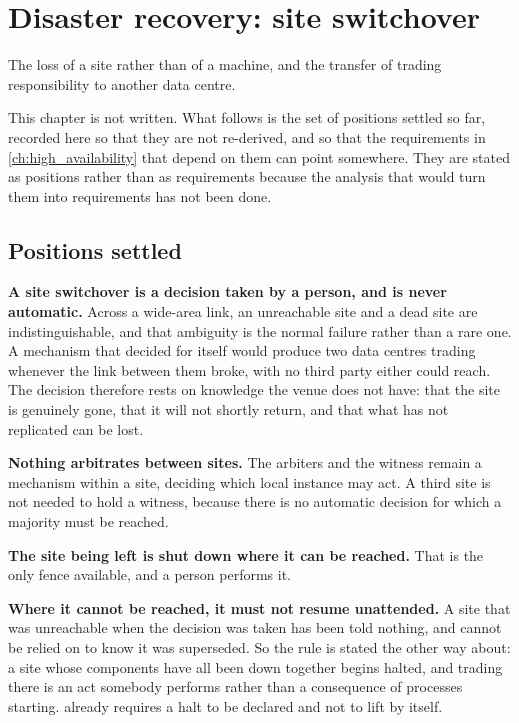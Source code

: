 \chapter{Disaster recovery: site switchover}
\label{ch:disaster_recovery}

The loss of a site rather than of a machine, and the transfer of trading
responsibility to another data centre.

This chapter is not written. What follows is the set of positions settled so far,
recorded here so that they are not re-derived, and so that the requirements in
\cref{ch:high_availability} that depend on them can point somewhere. They are
stated as positions rather than as requirements because the analysis that would
turn them into requirements has not been done.

\section{Positions settled}
\label{sec:dr:settled}

\textbf{A site switchover is a decision taken by a person, and is never
automatic.} Across a wide-area link, an unreachable site and a dead site are
indistinguishable, and that ambiguity is the normal failure rather than a rare
one. A mechanism that decided for itself would produce two data centres trading
whenever the link between them broke, with no third party either could reach. The
decision therefore rests on knowledge the venue does not have: that the site is
genuinely gone, that it will not shortly return, and that what has not replicated
can be lost.

\textbf{Nothing arbitrates between sites.} The arbiters and the witness remain a
mechanism within a site, deciding which local instance may act. A third site is
not needed to hold a witness, because there is no automatic decision for which a
majority must be reached.

\textbf{The site being left is shut down where it can be reached.} That is the
only fence available, and a person performs it.

\textbf{Where it cannot be reached, it must not resume unattended.} A site that
was unreachable when the decision was taken has been told nothing, and cannot be
relied on to know it was superseded. So the rule is stated the other way about: a
site whose components have all been down together begins halted, and trading
there is an act somebody performs rather than a consequence of processes
starting.  already requires a halt to be
declared and not to lift by itself.


